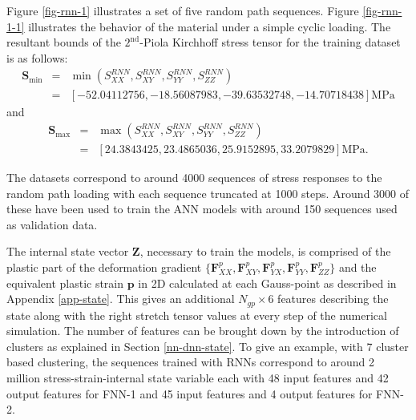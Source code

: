 Figure \ref{fig-rnn-1} illustrates a set of five random path sequences. Figure \ref{fig-rnn-1-1} illustrates the behavior of the material under a simple cyclic loading. The resultant bounds of the $ 2^\text{nd} $-Piola Kirchhoff stress tensor for the training dataset is as follows:
\begin{eqnarray}\label{eq-rnn-res3}
\textbf{S}_\text{min}&=&\min\left(S_{XX}^{RNN},S_{XY}^{RNN},S_{YY}^{RNN},S_{ZZ}^{RNN}\right)\nonumber\\&=&\left[-52.04112756, -18.56087983, -39.63532748,
-14.70718438\right]\text{MPa}\nonumber
\end{eqnarray}
and
\begin{eqnarray}\label{eq-rnn-res4}
\textbf{S}_\text{max}&=&\max\left(S_{XX}^{RNN},S_{XY}^{RNN},S_{YY}^{RNN},S_{ZZ}^{RNN}\right)\nonumber\\&=&\left[24.3843425, 23.4865036, 25.9152895, 33.2079829\right]\text{MPa}.\nonumber
\end{eqnarray}

The datasets correspond to around 4000 sequences of stress responses to the random path loading with each sequence truncated at 1000 steps. Around 3000 of these have been used to train the ANN models with around 150 sequences used as validation data.

The internal state vector $ \textbf{Z} $, necessary to train the \fnn models, is comprised of the plastic part of the deformation gradient $ \{\textbf{F}^p_{XX},\textbf{F}^p_{XY},\textbf{F}^p_{YX},\textbf{F}^p_{YY},\textbf{F}^p_{ZZ}\} $ and the equivalent plastic strain $ \textbf{p} $ in 2D calculated at each Gauss-point as described in Appendix \ref{app-state}. This gives an additional $ N_{gp}\times 6$ features describing the state along with the right stretch tensor values at every step of the numerical simulation. The number of features can be brought down by the introduction of clusters as explained in Section \ref{nn-dnn-state}. To give an example, with 7 cluster based clustering, the sequences trained with RNNs correspond to around 2 million stress-strain-internal state variable each with 48 input features and 42 output features for FNN-1 and 45 input features and 4 output features for FNN-2.

